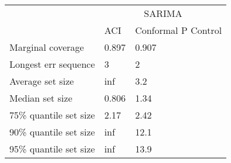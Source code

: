\begin{tabular}{lll}
\toprule
& \multicolumn{2}{c}{SARIMA} \\
& ACI & Conformal P Control \\
\midrule
Marginal coverage & 0.897 & 0.907 \\
Longest err sequence & 3 & 2 \\
Average set size & inf & 3.2 \\
Median set size & 0.806 & 1.34 \\
75\% quantile set size & 2.17 & 2.42 \\
90\% quantile set size & inf & 12.1 \\
95\% quantile set size & inf & 13.9 \\
\bottomrule
\end{tabular}
